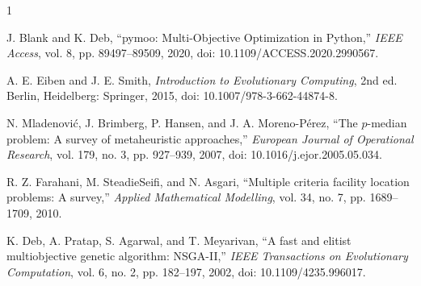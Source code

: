 \documentclass[journal]{IEEEtran}
\begin{document}
\begin{thebibliography}{1}
	
	J. Blank and K. Deb,
	``pymoo: Multi-Objective Optimization in Python,''
	\textit{IEEE Access},
	vol. 8, pp. 89497--89509, 2020,
	doi: 10.1109/ACCESS.2020.2990567.
	
	A. E. Eiben and J. E. Smith,
	\textit{Introduction to Evolutionary Computing},
	2nd ed.
	Berlin, Heidelberg: Springer, 2015,
	doi: 10.1007/978-3-662-44874-8.
	
	N. Mladenovi\'c, J. Brimberg, P. Hansen, and J. A. Moreno-P\'erez,
	``The $p$-median problem: A survey of metaheuristic approaches,''
	\textit{European Journal of Operational Research},
	vol. 179, no. 3, pp. 927--939, 2007,
	doi: 10.1016/j.ejor.2005.05.034.
	
	R. Z. Farahani, M. SteadieSeifi, and N. Asgari,
	``Multiple criteria facility location problems: A survey,''
	\textit{Applied Mathematical Modelling},
	vol. 34, no. 7, pp. 1689--1709, 2010.
	
	K. Deb, A. Pratap, S. Agarwal, and T. Meyarivan,
	``A fast and elitist multiobjective genetic algorithm: NSGA-II,''
	\textit{IEEE Transactions on Evolutionary Computation},
	vol. 6, no. 2, pp. 182--197, 2002,
	doi: 10.1109/4235.996017.
	

\end{thebibliography}
\end{document}
